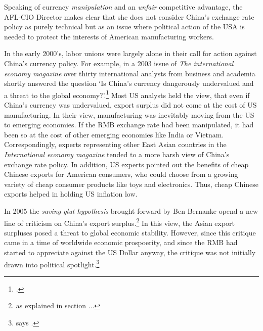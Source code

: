 Speaking of currency \emph{manipulation} and an \emph{unfair} competitive advantage, the AFL-CIO Director makes clear that she does not consider China's exchange rate policy as purely technical but as an issue where political action of the USA is needed to protect the interests of American manufacturing workers.

In the early 2000's, labor unions were largely alone in their call for action against China's currency policy. For example, in a 2003 issue of \emph{The international economy magazine} over thirty international analysts from business and academia shortly answered the question `Is China's currency dangerously undervalued and a threat to the global economy?'.\footnote{\cite{IEM2003}.}
Most US analysts held the view, that even if China's currency was undervalued, export surplus did not come at the cost of US manufacturing. In their view, manufacturing was inevitably moving from the US to emerging economies. If the RMB exchange rate had been manipulated, it had been so at the cost of other emerging economies like India or Vietnam. Correspondingly, experts representing other East Asian countries in the \emph{International economy magazine} tended to a more harsh view of China's exchange rate policy. In addition, US experts pointed out the benefits of cheap Chinese exports for American consumers, who could choose from a growing variety of cheap consumer products like toys and electronics. Thus, cheap Chinese exports helped in holding US inflation low.

In 2005 the \emph{saving glut hypothesis} brought forward by Ben 
Bernanke opend a new line of criticism on China's export 
surplus.\footnote{as explained in section ...} %
In this view, the Asian export surpluses posed a threat to global 
economic stability. However, since this critique came in a time of 
worldwide economic prospoerity, and since the RMB had started to 
appreciate against the US Dollar anyway, the critique was not initially 
drawn into political spotlight.\footnote{says \cite[p.16]{Levy2010}.}

